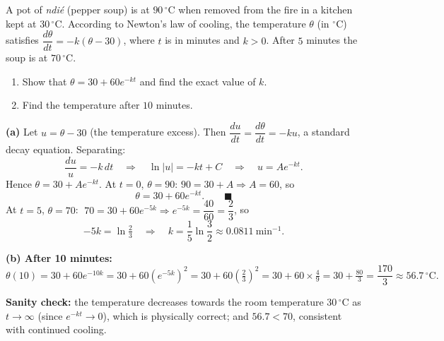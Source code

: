 \documentclass[11pt]{article}
\begin{document}
\begin{exoresolu}
A pot of \emph{ndi\'e} (pepper soup) is at $90\,^\circ\mathrm{C}$ when removed from the fire in a kitchen kept at $30\,^\circ\mathrm{C}$. According to Newton's law of cooling, the temperature $\theta$ (in $^\circ$C) satisfies $\dfrac{d\theta}{dt} = -k(\theta - 30)$, where $t$ is in minutes and $k > 0$. After $5$ minutes the soup is at $70\,^\circ\mathrm{C}$.
\begin{enumerate}
\item[(a)] Show that $\theta = 30 + 60e^{-kt}$ and find the exact value of $k$.
\item[(b)] Find the temperature after $10$ minutes.
\end{enumerate}
\tcblower
\textbf{(a)} Let $u = \theta - 30$ (the temperature excess). Then $\dfrac{du}{dt} = \dfrac{d\theta}{dt} = -ku$, a standard decay equation. Separating:
\[ \frac{du}{u} = -k\, dt \quad\Longrightarrow\quad \ln|u| = -kt + C \quad\Longrightarrow\quad u = Ae^{-kt}. \]
Hence $\theta = 30 + Ae^{-kt}$. At $t = 0$, $\theta = 90$: $90 = 30 + A \Rightarrow A = 60$, so
\[ \theta = 30 + 60e^{-kt}. \qquad\blacksquare \]
At $t = 5$, $\theta = 70$: $\;70 = 30 + 60e^{-5k} \Rightarrow e^{-5k} = \dfrac{40}{60} = \dfrac{2}{3}$, so
\[ -5k = \ln\tfrac{2}{3} \quad\Longrightarrow\quad k = \frac{1}{5}\ln\frac{3}{2} \approx 0.0811\ \mathrm{min^{-1}}. \]

\textbf{(b) After 10 minutes:}
\[ \theta(10) = 30 + 60e^{-10k} = 30 + 60\left(e^{-5k}\right)^2 = 30 + 60\left(\tfrac{2}{3}\right)^2 = 30 + 60 \times \tfrac{4}{9} = 30 + \tfrac{80}{3} = \frac{170}{3} \approx 56.7\,^\circ\mathrm{C}. \]

\textbf{Sanity check:} the temperature decreases towards the room temperature $30\,^\circ\mathrm{C}$ as $t \to \infty$ (since $e^{-kt} \to 0$), which is physically correct; and $56.7 < 70$, consistent with continued cooling.
\end{exoresolu}
\end{document}
